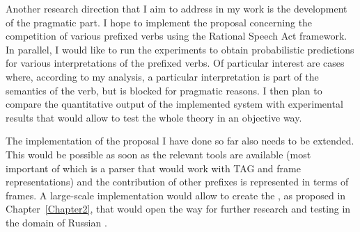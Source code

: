 Another research direction that I aim to address in my  work is the development of the pragmatic part. I hope to implement the proposal concerning the competition of various prefixed verbs using the Rational Speech Act framework. In parallel, I would like to run the experiments to obtain probabilistic predictions for various interpretations of the prefixed verbs.  Of particular interest are cases where, according to my analysis, a particular interpretation is part of the semantics of the verb, but is blocked for pragmatic reasons. I then plan to compare the quantitative output of the implemented system with experimental results that would allow to test the whole theory in an objective way.

The implementation of the proposal I have done so far also needs to be extended. This would be possible as soon as the relevant tools are available (most important of which is a parser that would work with TAG and frame representations) and the contribution of other prefixes is represented in terms of frames. A large-scale implementation would allow to create the , as proposed in Chapter~\ref{Chapter2}, that would open the way for further research and testing in the domain of Russian . 